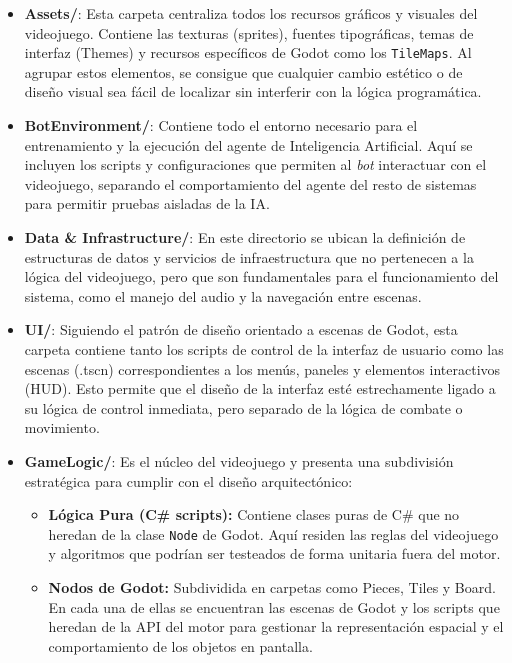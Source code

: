 \begin{itemize}
	\item \textbf{Assets/}: Esta carpeta centraliza todos los recursos gráficos y visuales del videojuego. Contiene las texturas (sprites), fuentes tipográficas, temas de interfaz (Themes) y recursos específicos de Godot como los \texttt{TileMaps}. Al agrupar estos elementos, se consigue que cualquier cambio estético o de diseño visual sea fácil de localizar sin interferir con la lógica programática.
	
	\item \textbf{BotEnvironment/}: Contiene todo el entorno necesario para el entrenamiento y la ejecución del agente de Inteligencia Artificial. Aquí se incluyen los scripts y configuraciones que permiten al \textit{bot} interactuar con el videojuego, separando el comportamiento del agente del resto de sistemas para permitir pruebas aisladas de la IA.
	
	\item \textbf{Data \& Infrastructure/}: En este directorio se ubican la definición de estructuras de datos y servicios de infraestructura que no pertenecen a la lógica del videojuego, pero que son fundamentales para el funcionamiento del sistema, como el manejo del audio y la navegación entre escenas.
	
	\item \textbf{UI/}: Siguiendo el patrón de diseño orientado a escenas de Godot, esta carpeta contiene tanto los scripts de control de la interfaz de usuario como las escenas (.tscn) correspondientes a los menús, paneles y elementos interactivos (HUD). Esto permite que el diseño de la interfaz esté estrechamente ligado a su lógica de control inmediata, pero separado de la lógica de combate o movimiento.
	
	\item \textbf{GameLogic/}: Es el núcleo del videojuego y presenta una subdivisión estratégica para cumplir con el diseño arquitectónico:
	\begin{itemize}
		\item \textbf{Lógica Pura (C\# scripts):} Contiene clases puras de C\# que no heredan de la clase \texttt{Node} de Godot. Aquí residen las reglas del videojuego y algoritmos que podrían ser testeados de forma unitaria fuera del motor.
		\item \textbf{Nodos de Godot:} Subdividida en carpetas como Pieces, Tiles y Board. En cada una de ellas se encuentran las escenas de Godot y los scripts que heredan de la API del motor para gestionar la representación espacial y el comportamiento de los objetos en pantalla.
	\end{itemize}
\end{itemize}

